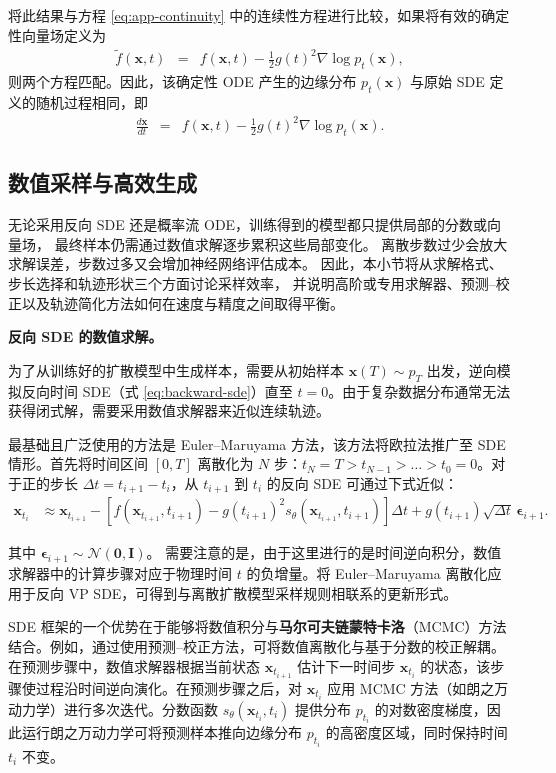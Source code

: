 将此结果与方程 \eqref{eq:app-continuity} 中的连续性方程进行比较，如果将有效的确定性向量场定义为
\begin{eqnarray}
\tilde{f}(\mathbf{x}, t) & = & f(\mathbf{x}, t) - \frac{1}{2} g(t)^2 \nabla \log p_t(\mathbf{x}),
\end{eqnarray}
则两个方程匹配。因此，该确定性 ODE 产生的边缘分布 $p_t(\mathbf{x})$ 与原始 SDE 定义的随机过程相同，即
\begin{eqnarray}
\frac{d\mathbf{x}}{dt} & = & f(\mathbf{x}, t) - \frac{1}{2} g(t)^2 \nabla \log p_t(\mathbf{x}).
\end{eqnarray}

\subsection{数值采样与高效生成}

无论采用反向 SDE 还是概率流 ODE，训练得到的模型都只提供局部的分数或向量场，
最终样本仍需通过数值求解逐步累积这些局部变化。
离散步数过少会放大求解误差，步数过多又会增加神经网络评估成本。
因此，本小节将从求解格式、步长选择和轨迹形状三个方面讨论采样效率，
并说明高阶或专用求解器、预测--校正以及轨迹简化方法如何在速度与精度之间取得平衡。

\textbf{反向 SDE 的数值求解。}

为了从训练好的扩散模型中生成样本，需要从初始样本 $\mathbf{x}(T) \sim p_T$ 出发，逆向模拟反向时间 SDE（式 \eqref{eq:backward-sde}）直至 $t=0$。由于复杂数据分布通常无法获得闭式解，需要采用数值求解器来近似连续轨迹。

最基础且广泛使用的方法是 Euler--Maruyama 方法，该方法将欧拉法推广至 SDE 情形。首先将时间区间 $[0, T]$ 离散化为 $N$ 步：$t_N = T > t_{N-1} > \dots > t_0 = 0$。对于正的步长 $\Delta t = t_{i+1} - t_i$，从 $t_{i+1}$ 到 $t_i$ 的反向 SDE 可通过下式近似：
\begin{align}
\mathbf{x}_{t_i} &\approx \mathbf{x}_{t_{i+1}}
- \left[ f(\mathbf{x}_{t_{i+1}}, t_{i+1})
- g(t_{i+1})^2 s_\theta(\mathbf{x}_{t_{i+1}}, t_{i+1}) \right] \Delta t
+ g(t_{i+1}) \sqrt{\Delta t} \, \boldsymbol{\epsilon}_{i+1}.
\label{eq:reverse-em}
\end{align}

\noindent 其中 $\boldsymbol{\epsilon}_{i+1}\sim\mathcal{N}(\mathbf{0},\mathbf{I})$。
需要注意的是，由于这里进行的是时间逆向积分，数值求解器中的计算步骤对应于物理时间 $t$ 的负增量。将 Euler--Maruyama 离散化应用于反向 VP SDE，可得到与离散扩散模型采样规则相联系的更新形式。

SDE 框架的一个优势在于能够将数值积分与\textbf{马尔可夫链蒙特卡洛}（MCMC）方法结合。例如，通过使用预测--校正方法，可将数值离散化与基于分数的校正解耦。在预测步骤中，数值求解器根据当前状态 $\mathbf{x}_{t_{i+1}}$ 估计下一时间步 $\mathbf{x}_{t_i}$ 的状态，该步骤使过程沿时间逆向演化。在预测步骤之后，对 $\mathbf{x}_{t_i}$ 应用 MCMC 方法（如朗之万动力学）进行多次迭代。分数函数 $s_\theta(\mathbf{x}_{t_i}, t_i)$ 提供分布 $p_{t_i}$ 的对数密度梯度，因此运行朗之万动力学可将预测样本推向边缘分布 $p_{t_i}$ 的高密度区域，同时保持时间 $t_i$ 不变。


